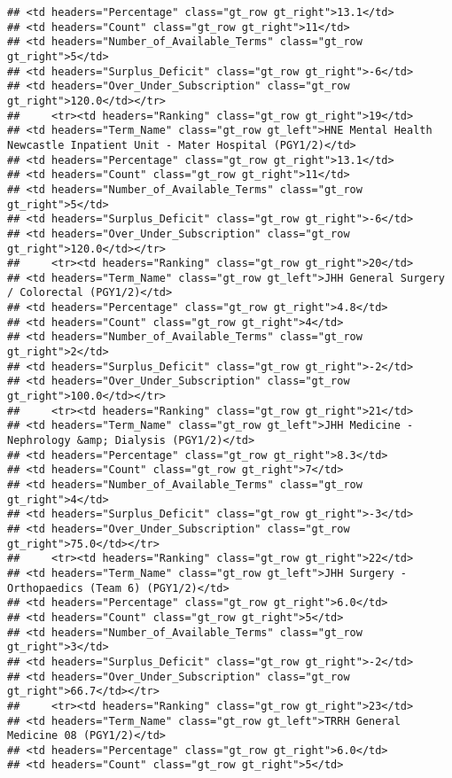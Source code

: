 \documentclass[
]{article}
\begin{document}
\begin{verbatim}
## <td headers="Percentage" class="gt_row gt_right">13.1</td>
## <td headers="Count" class="gt_row gt_right">11</td>
## <td headers="Number_of_Available_Terms" class="gt_row gt_right">5</td>
## <td headers="Surplus_Deficit" class="gt_row gt_right">-6</td>
## <td headers="Over_Under_Subscription" class="gt_row gt_right">120.0</td></tr>
##     <tr><td headers="Ranking" class="gt_row gt_right">19</td>
## <td headers="Term_Name" class="gt_row gt_left">HNE Mental Health Newcastle Inpatient Unit - Mater Hospital (PGY1/2)</td>
## <td headers="Percentage" class="gt_row gt_right">13.1</td>
## <td headers="Count" class="gt_row gt_right">11</td>
## <td headers="Number_of_Available_Terms" class="gt_row gt_right">5</td>
## <td headers="Surplus_Deficit" class="gt_row gt_right">-6</td>
## <td headers="Over_Under_Subscription" class="gt_row gt_right">120.0</td></tr>
##     <tr><td headers="Ranking" class="gt_row gt_right">20</td>
## <td headers="Term_Name" class="gt_row gt_left">JHH General Surgery / Colorectal (PGY1/2)</td>
## <td headers="Percentage" class="gt_row gt_right">4.8</td>
## <td headers="Count" class="gt_row gt_right">4</td>
## <td headers="Number_of_Available_Terms" class="gt_row gt_right">2</td>
## <td headers="Surplus_Deficit" class="gt_row gt_right">-2</td>
## <td headers="Over_Under_Subscription" class="gt_row gt_right">100.0</td></tr>
##     <tr><td headers="Ranking" class="gt_row gt_right">21</td>
## <td headers="Term_Name" class="gt_row gt_left">JHH Medicine - Nephrology &amp; Dialysis (PGY1/2)</td>
## <td headers="Percentage" class="gt_row gt_right">8.3</td>
## <td headers="Count" class="gt_row gt_right">7</td>
## <td headers="Number_of_Available_Terms" class="gt_row gt_right">4</td>
## <td headers="Surplus_Deficit" class="gt_row gt_right">-3</td>
## <td headers="Over_Under_Subscription" class="gt_row gt_right">75.0</td></tr>
##     <tr><td headers="Ranking" class="gt_row gt_right">22</td>
## <td headers="Term_Name" class="gt_row gt_left">JHH Surgery - Orthopaedics (Team 6) (PGY1/2)</td>
## <td headers="Percentage" class="gt_row gt_right">6.0</td>
## <td headers="Count" class="gt_row gt_right">5</td>
## <td headers="Number_of_Available_Terms" class="gt_row gt_right">3</td>
## <td headers="Surplus_Deficit" class="gt_row gt_right">-2</td>
## <td headers="Over_Under_Subscription" class="gt_row gt_right">66.7</td></tr>
##     <tr><td headers="Ranking" class="gt_row gt_right">23</td>
## <td headers="Term_Name" class="gt_row gt_left">TRRH General Medicine 08 (PGY1/2)</td>
## <td headers="Percentage" class="gt_row gt_right">6.0</td>
## <td headers="Count" class="gt_row gt_right">5</td>

\end{verbatim}
\end{document}
